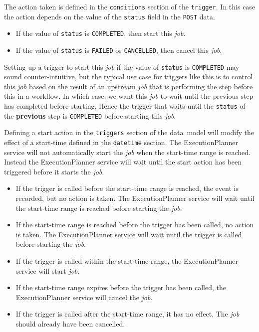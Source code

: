 \documentclass[11pt,a4paper]{ivoa}
\newcommand{\datamodel} {data~model}
\newcommand{\execplanner} {ExecutionPlanner}
\newcommand{\codeword}[1] {\texttt{#1}}
\newcommand{\job} {\textit{job}}
\begin{document}
The action taken is defined in the \codeword{conditions} section of the \codeword{trigger}.
In this case the action depends on the value of the \codeword{status} field in the \codeword{POST} data.
\begin{itemize}
    \item If the value of \codeword{status} is \codeword{COMPLETED}, then start this \job{}.
    \item If the value of \codeword{status} is \codeword{FAILED} or \codeword{CANCELLED}, then cancel this \job{}.
\end{itemize}

Setting up a trigger to start this \job{} if the value of \codeword{status} is \codeword{COMPLETED}
may sound counter-intuitive, but the typical use case for triggers like this is to
control this \job{} based on the result of an upstream \job{} that is performing the
step before this in a workflow.
In which case, we want this \job{} to wait until the previous step has completed before starting.
Hence the trigger that waits until the \codeword{status} of the \textbf{previous} step is
\codeword{COMPLETED} before starting this \job{}.

Defining a start action in the \codeword{triggers} section of the \datamodel{} will modify the
effect of a start-time defined in the \codeword{datetime} section.
The \execplanner{} service will not automatically start the \job{} when the start-time range is reached.
Instead the \execplanner{} service will wait until the start action has been triggered before it starts the \job{}.

\begin{itemize}
    \item If the trigger is called before the start-time range is reached, the event is recorded,
    but no action is taken.
    The \execplanner{} service will wait until the start-time range is reached before starting the \job{}.
    \item If the start-time range is reached before the trigger has been called,
    no action is taken. The \execplanner{} service will wait until the trigger is called before starting the \job{}.
    \item If the trigger is called within the start-time range, the \execplanner{} service will start \job{}.
    \item If the start-time range expires before the trigger has been called, the \execplanner{} service will cancel the \job{}.
    \item If the trigger is called after the start-time range, it has no effect. The \job{} should already have been cancelled.
\end{itemize}
\end{document}
